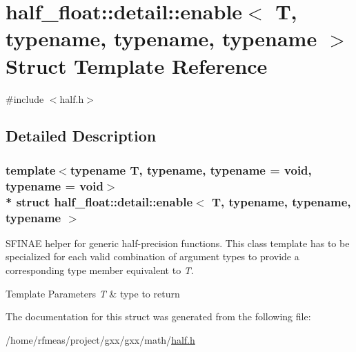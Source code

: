 \hypertarget{structhalf__float_1_1detail_1_1enable}{}\section{half\+\_\+float\+:\+:detail\+:\+:enable$<$ T, typename, typename, typename $>$ Struct Template Reference}
\label{structhalf__float_1_1detail_1_1enable}


{\ttfamily \#include $<$half.\+h$>$}



\subsection{Detailed Description}
\subsubsection*{template$<$typename T, typename, typename = void, typename = void$>$\\*
struct half\+\_\+float\+::detail\+::enable$<$ T, typename, typename, typename $>$}

S\+F\+I\+N\+AE helper for generic half-\/precision functions. This class template has to be specialized for each valid combination of argument types to provide a corresponding {\ttfamily type} member equivalent to {\itshape T}. 
\begin{DoxyTemplParams}{Template Parameters}
{\em T} & type to return \\
\hline
\end{DoxyTemplParams}


The documentation for this struct was generated from the following file\+:\begin{DoxyCompactItemize}
\item 
/home/rfmeas/project/gxx/gxx/math/\hyperlink{half_8h}{half.\+h}\end{DoxyCompactItemize}
